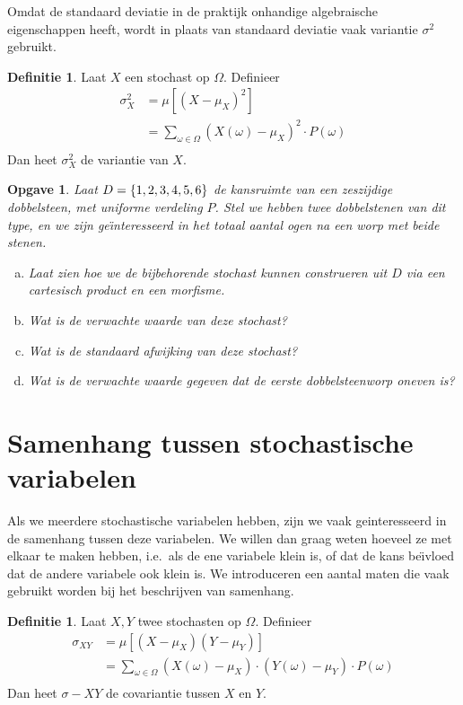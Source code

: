 \documentclass[a4paper]{book}
\newtheorem{exercise}[theorem]{Opgave}
\theoremstyle{definition}
\newtheorem{definition}[theorem]{Definitie}
\begin{document}
Omdat de standaard deviatie in de praktijk onhandige algebraische eigenschappen heeft, wordt in plaats van standaard deviatie vaak variantie
$\sigma^2$ gebruikt.

\begin{definition}
    Laat $X$ een stochast op $\Omega$.
    Definieer
    \begin{align*}
        \sigma^2_X &= \mu[ {(X - \mu_X)}^2 ] \\
                    &= \sum_{\omega \in \Omega} {(X(\omega) - \mu_X)}^2 \cdot P(\omega) \\
    \end{align*}
    Dan heet $\sigma^2_X$ de variantie van $X$.
\end{definition}

\begin{exercise}
    Laat $D = \set{1,2,3,4,5,6}$ de kansruimte van een zeszijdige dobbelsteen, met uniforme verdeling $P$.
    Stel we hebben twee dobbelstenen van dit type, en we zijn ge\"{\i}nteresseerd in het totaal aantal ogen na een worp met beide stenen.
    \begin{enumerate}[a.]
    \item Laat zien hoe we de bijbehorende stochast kunnen construeren uit $D$ via een cartesisch product en een morfisme.
    \item Wat is de verwachte waarde van deze stochast?
    \item Wat is de standaard afwijking van deze stochast?
    \item Wat is de verwachte waarde gegeven dat de eerste dobbelsteenworp oneven is?
    \end{enumerate}
\end{exercise}


\section{Samenhang tussen stochastische variabelen}
Als we meerdere stochastische variabelen hebben, zijn we vaak geinteresseerd in de samenhang tussen deze variabelen.
We willen dan graag weten hoeveel ze met elkaar te maken hebben, i.e.\ als de ene variabele klein is, of dat de kans be\"{\i}vloed dat de andere
variabele ook klein is. We introduceren een aantal maten die vaak gebruikt worden bij het beschrijven van samenhang.

\begin{definition}
    Laat $X,Y$ twee stochasten op $\Omega$.
    Definieer
    \begin{align*}
        \sigma_{XY} &= \mu[ (X - \mu_X)(Y - \mu_Y) ] \\
                    &= \sum_{\omega \in \Omega} (X(\omega) - \mu_X) \cdot (Y(\omega) - \mu_Y) \cdot P(\omega) \\
    \end{align*}
    Dan heet $\sigma-{XY}$ de covariantie tussen $X$ en $Y$.
\end{definition}
\end{document}
